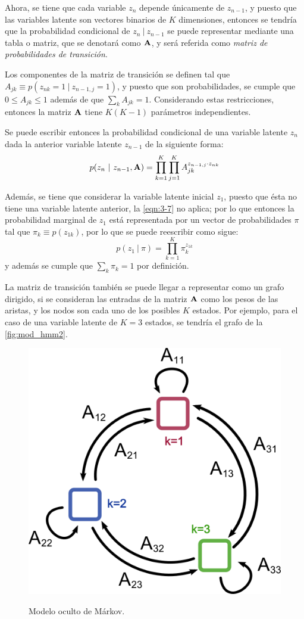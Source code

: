 Ahora, se tiene que cada variable $z_n$ depende únicamente de $z_{n-1}$, y puesto que 
las variables latente son vectores binarios de $K$ dimensiones, entonces se tendría que 
la probabilidad condicional de $z_n ~|~ z_{n-1}$ se puede representar mediante una tabla 
o matriz, que se denotará como $\textbf{A}$, y será referida como \textit{matriz de 
probabilidades de transición}. 

Los componentes de la matriz de transición se definen tal que $A_{jk} \equiv p(z_{nk} = 1 ~|~  z_{n-1, j} = 1)$, 
y puesto que son probabilidades, se cumple que $0 \leq A_{jk} \leq 1$ además de que 
$\sum_k A_{jk} = 1$. Considerando estas restricciones, entonces la matriz $\textbf{A}$ 
tiene $K (K-1)$ parámetros independientes.

Se puede escribir entonces la probabilidad condicional de una variable latente $z_n$ 
dada la anterior variable latente $z_{n-1}$ de la siguiente forma: 
\begin{equation}
\label{eqn:3-8}
p(z_n ~|~ z_{n-1}, \textbf{A}) = \prod_{k=1}^K \prod_{j=1}^K A_{jk}^{z_{n-1, j} \cdot z_{nk}}
\end{equation}

Además, se tiene que considerar la variable latente inicial $z_1$, puesto que ésta no 
tiene una variable latente anterior, la \autoref{eqn:3-7} no aplica; por lo que entonces 
la probabilidad marginal de $z_1$ está representada por un vector de probabilidades $\pi$ 
tal que $\pi_k \equiv p(z_{1k})$, por lo que se puede reescribir como sigue: 
\begin{equation}
p(z_1 ~|~ \pi) = \prod_{k=1}^K \pi_k^{z_{1k}}
\end{equation}
y además se cumple que $\sum_k \pi_k = 1$ por definición.

La matriz de transición también se puede llegar a representar como un grafo dirigido, si 
se consideran las entradas de la matriz $\textbf{A}$ como los pesos de las aristas, y los 
nodos son cada uno de los posibles $K$ estados. Por ejemplo, para el caso de una variable 
latente de $K = 3$ estados, se tendría el grafo de la \autoref{fig:mod_hmm2}.

\begin{figure}[hbt]
        \myfloatalign
        {\includegraphics[width=0.4\linewidth]{gfx/3-mod-hmm2}}
        \caption{Modelo oculto de Márkov.}
        \label{fig:mod_hmm2}
\end{figure}

